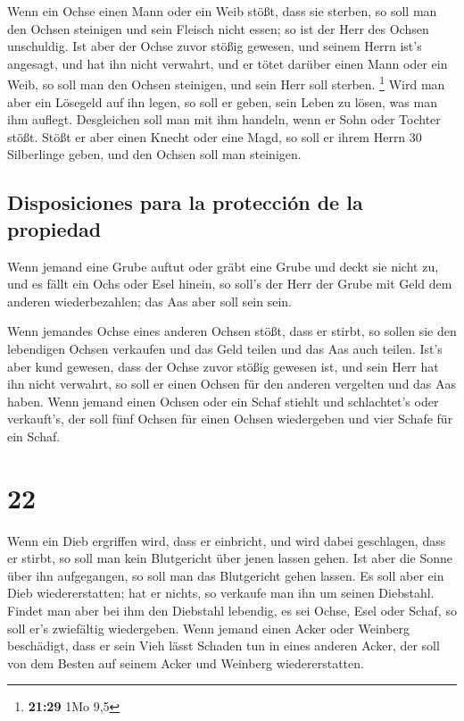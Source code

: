  Wenn ein Ochse einen Mann oder ein Weib stößt, dass sie
sterben, so soll man den Ochsen steinigen und sein Fleisch nicht essen;
so ist der Herr des Ochsen unschuldig.  Ist aber der
Ochse zuvor stößig gewesen, und seinem Herrn ist's angesagt, und hat ihn
nicht verwahrt, und er tötet darüber einen Mann oder ein Weib, so soll
man den Ochsen steinigen, und sein Herr soll sterben. \footnote{\textbf{21:29}
  1Mo 9,5}  Wird man aber ein Lösegeld auf ihn legen, so
soll er geben, sein Leben zu lösen, was man ihm auflegt. 
Desgleichen soll man mit ihm handeln, wenn er Sohn oder Tochter stößt.
 Stößt er aber einen Knecht oder eine Magd, so soll er
ihrem Herrn 30 Silberlinge geben, und den Ochsen soll man steinigen.

\hypertarget{disposiciones-para-la-protecciuxf3n-de-la-propiedad}{%
\subsection{Disposiciones para la protección de la
propiedad}\label{disposiciones-para-la-protecciuxf3n-de-la-propiedad}}

 Wenn jemand eine Grube auftut oder gräbt eine Grube und
deckt sie nicht zu, und es fällt ein Ochs oder Esel hinein,
 so soll's der Herr der Grube mit Geld dem anderen
wiederbezahlen; das Aas aber soll sein sein.

 Wenn jemandes Ochse eines anderen Ochsen stößt, dass er
stirbt, so sollen sie den lebendigen Ochsen verkaufen und das Geld
teilen und das Aas auch teilen.  Ist's aber kund gewesen,
dass der Ochse zuvor stößig gewesen ist, und sein Herr hat ihn nicht
verwahrt, so soll er einen Ochsen für den anderen vergelten und das Aas
haben.  Wenn jemand einen Ochsen oder ein Schaf stiehlt
und schlachtet's oder verkauft's, der soll fünf Ochsen für einen Ochsen
wiedergeben und vier Schafe für ein Schaf.

\hypertarget{section-21}{%
\section{22}\label{section-21}}

 Wenn ein Dieb ergriffen wird, dass er einbricht, und wird
dabei geschlagen, dass er stirbt, so soll man kein Blutgericht über
jenen lassen gehen.  Ist aber die Sonne über ihn
aufgegangen, so soll man das Blutgericht gehen lassen. Es soll aber ein
Dieb wiedererstatten; hat er nichts, so verkaufe man ihn um seinen
Diebstahl.  Findet man aber bei ihm den Diebstahl
lebendig, es sei Ochse, Esel oder Schaf, so soll er's zwiefältig
wiedergeben.  Wenn jemand einen Acker oder Weinberg
beschädigt, dass er sein Vieh lässt Schaden tun in eines anderen Acker,
der soll von dem Besten auf seinem Acker und Weinberg wiedererstatten.

